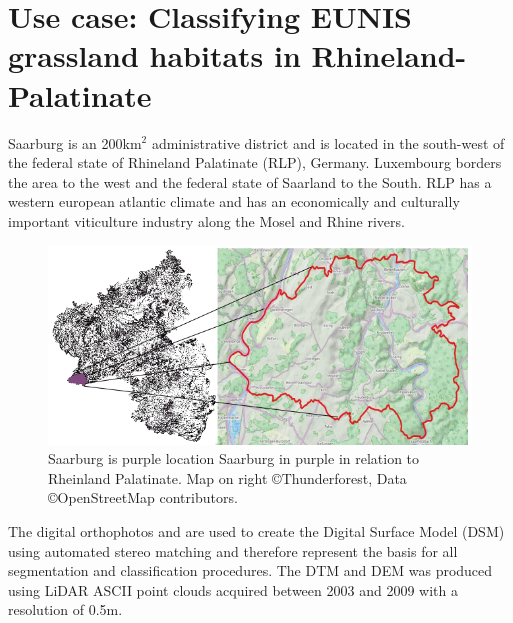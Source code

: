 \documentclass[authoryear, review,12pt,number]{elsarticle}
\begin{document}
\section{Use case: Classifying EUNIS grassland habitats in
Rhineland-Palatinate}
\label{subsec_data_study_area}
Saarburg is an 200km$^{2}$ administrative district and is located in the
south-west of the federal state of Rhineland Palatinate (RLP), Germany.
Luxembourg borders the area to the west and the federal state of Saarland to
the South. RLP has a western european atlantic climate and has an economically
and culturally important viticulture industry along the Mosel and Rhine rivers.
\begin{figure}
\label{fig_study_area}
    \includegraphics[width=\textwidth]{diagrams/study_area_closeup.png}
    \caption{Saarburg is purple location Saarburg in purple in relation to
    Rheinland Palatinate. Map on right \copyright Thunderforest, Data
\copyright OpenStreetMap contributors.}
\end{figure}
The digital orthophotos and are used to create the Digital Surface Model (DSM)
using automated stereo matching and therefore represent the basis for all
segmentation and classification procedures.
The DTM and DEM was produced using LiDAR ASCII point clouds acquired between 
2003 and 2009 with a resolution of 0.5m.\\
\end{document}
